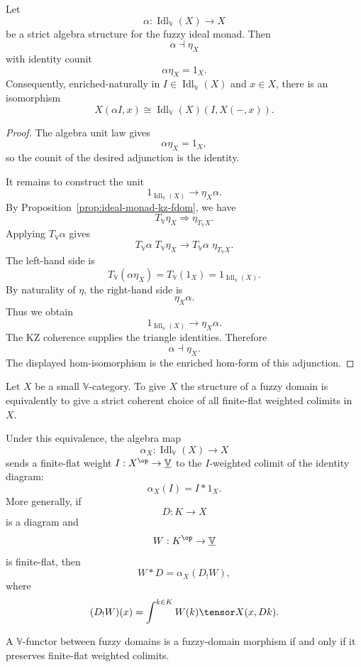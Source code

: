\begin{theorem}
\label{thm:algebra-map-left-adjoint-y-fdom}
Let
\[
    \alpha:\operatorname{Idl}_{\mathbb V}(X)\to X
\]
be a strict algebra structure for the fuzzy ideal monad.  Then
\[
    \alpha\dashv \eta_X
\]
with identity counit
\[
    \alpha\eta_X=1_X.
\]
Consequently, enriched-naturally in
\(I\in\operatorname{Idl}_{\mathbb V}(X)\) and \(x\in X\), there is an isomorphism
\[
    X(\alpha I,x)
    \cong
    \operatorname{Idl}_{\mathbb V}(X)(I,X(-,x)).
\]
\end{theorem}

\begin{proof}
The algebra unit law gives
\[
    \alpha\eta_X=1_X,
\]
so the counit of the desired adjunction is the identity.

It remains to construct the unit
\[
    1_{\operatorname{Idl}_{\mathbb V}(X)}
    \longrightarrow
    \eta_X\alpha.
\]
By Proposition~\ref{prop:ideal-monad-kz-fdom}, we have
\[
    T_{\mathbb V}\eta_X\Longrightarrow \eta_{T_{\mathbb V}X}.
\]
Applying \(T_{\mathbb V}\alpha\) gives
\[
    T_{\mathbb V}\alpha\;T_{\mathbb V}\eta_X
    \longrightarrow
    T_{\mathbb V}\alpha\;\eta_{T_{\mathbb V}X}.
\]
The left-hand side is
\[
    T_{\mathbb V}(\alpha\eta_X)=T_{\mathbb V}(1_X)=1_{\operatorname{Idl}_{\mathbb V}(X)}.
\]
By naturality of \(\eta\), the right-hand side is
\[
    \eta_X\alpha.
\]
Thus we obtain
\[
    1_{\operatorname{Idl}_{\mathbb V}(X)}
    \longrightarrow
    \eta_X\alpha.
\]
The KZ coherence supplies the triangle identities.  Therefore
\[
    \alpha\dashv\eta_X.
\]
The displayed hom-isomorphism is the enriched hom-form of this adjunction.
\end{proof}

\begin{theorem}
\label{thm:fuzzy-domains-ff-colimits}
Let \(X\) be a small \(\mathbb V\)-category.  To give \(X\) the structure of a
fuzzy domain is equivalently to give a strict coherent choice of all finite-flat
weighted colimits in \(X\).

Under this equivalence, the algebra map
\[
    \alpha_X:\operatorname{Idl}_{\mathbb V}(X)\to X
\]
sends a finite-flat weight \(I:X^{\op}\to\underline{\mathbb V}\) to the
\(I\)-weighted colimit of the identity diagram:
\[
    \alpha_X(I)=I*1_X.
\]
More generally, if
\[
    D:K\to X
\]
is a diagram and
\[
    W:K^{\op}\to\underline{\mathbb V}
\]
is finite-flat, then
\[
    W*D=\alpha_X(D_!W),
\]
where
\[
    (D_!W)(x)
    =
    \int^{k\in K}W(k)\tensor X(x,Dk).
\]

A \(\mathbb V\)-functor between fuzzy domains is a fuzzy-domain morphism if and
only if it preserves finite-flat weighted colimits.
\end{theorem}

